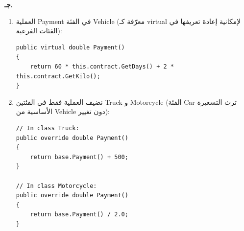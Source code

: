 \filbreak

\begin{boxSolution}
\textbf{جـ.}
\begin{enumerate}[label=\textbf{(\arabic*)}, itemsep=0.6em]
    \item العملية \textenglish{Payment} في الفئة \textenglish{Vehicle} (معرّفة كـ \textenglish{virtual} لإمكانية إعادة تعريفها في الفئات الفرعية):
\begin{boxCode}
\begin{english}
\begin{verbatim}
public virtual double Payment()
{
    return 60 * this.contract.GetDays() + 2 * this.contract.GetKilo();
}
\end{verbatim}
\end{english}
\end{boxCode}

    \item نضيف العملية فقط في الفئتين \textenglish{Truck} و \textenglish{Motorcycle} (الفئة \textenglish{Car} ترث التسعيرة الأساسية من \textenglish{Vehicle} دون تغيير):
\begin{boxCode}
\begin{english}
\begin{verbatim}
// In class Truck:
public override double Payment()
{
    return base.Payment() + 500;
}

// In class Motorcycle:
public override double Payment()
{
    return base.Payment() / 2.0;
}
\end{verbatim}
\end{english}
\end{boxCode}
\end{enumerate}
\end{boxSolution}
\fi
\filbreak
